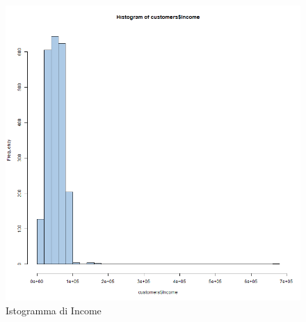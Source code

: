 \documentclass[letterpaper,11pt]{article}
\begin{document}
\begin{figure}[H]
\begin{minipage}[b]{0.4\textwidth}
    \includegraphics[width=\textwidth]{Img/DESCRIPTION/DESCRIPTION020.png}
    \caption{Istogramma di Income}
    \label{fig:Histogram_Income}
  \end{minipage}
\end{figure}
\end{document}
